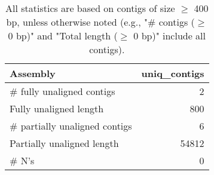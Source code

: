\documentclass[12pt,a4paper]{article}
\begin{document}
\begin{table}[ht]
\begin{center}
\caption{All statistics are based on contigs of size $\geq$ 400 bp, unless otherwise noted (e.g., "\# contigs ($\geq$ 0 bp)" and "Total length ($\geq$ 0 bp)" include all contigs).}
\begin{tabular}{|l*{1}{|r}|}
\hline
Assembly & uniq\_contigs \\ \hline
\# fully unaligned contigs & 2 \\ \hline
Fully unaligned length & 800 \\ \hline
\# partially unaligned contigs & 6 \\ \hline
Partially unaligned length & 54812 \\ \hline
\# N's & 0 \\ \hline
\end{tabular}
\end{center}
\end{table}
\end{document}
